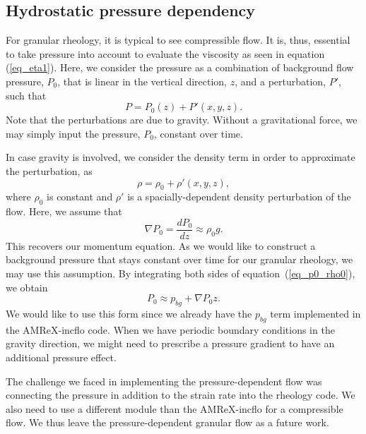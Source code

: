 \subsection{Hydrostatic pressure dependency}
For granular rheology, it is typical to see compressible flow. It is, thus, essential to take pressure into account to evaluate the viscosity as seen in equation (\ref{eq_eta1}).
Here, we consider the pressure as a combination of background flow pressure, $P_0$, that is linear in the vertical direction, $z$, and a perturbation, $P'$, such that
\[
P = P_0(z) + P'(x,y,z).\]
Note that the perturbations are due to gravity. Without a gravitational force, we may simply input the pressure, $P_0$, constant over time.
\par
In case gravity is involved, we consider the density term in order to approximate the perturbation, as 
\[
\rho  = \rho_0  + \rho'(x,y,z), 
\]
where $\rho_0$ is constant and $\rho'$ is a spacially-dependent density perturbation of the flow. 
Here, we assume that 
\begin{equation}
    \nabla P_0  = \frac{d P_0}{d z} \approx \rho_0  g.  
\label{eq_p0_rho0}
\end{equation}
This recovers our momentum equation. As we would like to construct a background pressure that stays constant over time for our granular rheology, we may use this assumption.
By integrating both sides of equation~(\ref{eq_p0_rho0}), we obtain
\begin{equation}
    P_0 \approx p_{bg} + \nabla P_0 z.
\end{equation}
We would like to use this form since we already have the $p_{bg}$ term implemented in the AMReX-incflo code.
%
When we have periodic boundary conditions in the gravity direction, we might need to prescribe a pressure gradient to have an additional pressure effect. 
\par
The challenge we faced in implementing the pressure-dependent flow was connecting the pressure in addition to the strain rate into the rheology code. 
We also need to use a different module than the AMReX-incflo for a compressible flow.
We thus leave the pressure-dependent granular flow as a future work.

